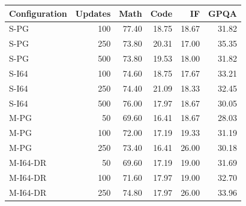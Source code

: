 \begin{tabular}{lrrrrr}
\toprule
Configuration & Updates & Math & Code & IF & GPQA \\
\midrule
S-PG & 100 & 77.40 & 18.75 & 18.67 & 31.82 \\
S-PG & 250 & 73.80 & 20.31 & 17.00 & 35.35 \\
S-PG & 500 & 73.80 & 19.53 & 18.00 & 31.82 \\
S-I64 & 100 & 74.60 & 18.75 & 17.67 & 33.21 \\
S-I64 & 250 & 74.40 & 21.09 & 18.33 & 32.45 \\
S-I64 & 500 & 76.00 & 17.97 & 18.67 & 30.05 \\
M-PG & 50 & 69.60 & 16.41 & 18.67 & 28.03 \\
M-PG & 100 & 72.00 & 17.19 & 19.33 & 31.19 \\
M-PG & 250 & 73.40 & 16.41 & 26.00 & 30.18 \\
M-I64-DR & 50 & 69.60 & 17.19 & 19.00 & 31.69 \\
M-I64-DR & 100 & 71.60 & 17.97 & 19.00 & 32.70 \\
M-I64-DR & 250 & 74.80 & 17.97 & 26.00 & 33.96 \\
\bottomrule
\end{tabular}
